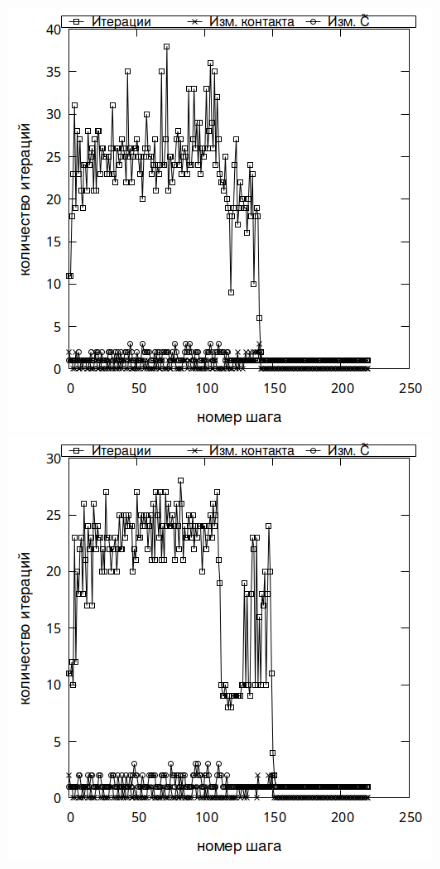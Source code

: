 \documentclass[]{article}
\begin{document}
\begin{figure}[h!]
	\centering
	\includegraphics[height=0.22\textheight]{pictures/I_0550.png}
	\includegraphics[height=0.22\textheight]{pictures/II_050.png}

\end{figure}
\end{document}
